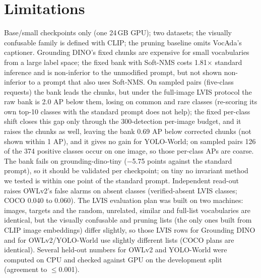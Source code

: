\documentclass[10pt,twocolumn,letterpaper]{article}
\begin{document}
\section{Limitations}
Base/small checkpoints only (one 24\,GB GPU); two datasets; the visually confusable family is defined with CLIP; the
pruning baseline omits VocAda's captioner. Grounding DINO's fixed chunks are expensive for small vocabularies from a large label space; the fixed bank with Soft-NMS costs 1.81$\times$ standard inference and is non-inferior to the unmodified prompt, but not shown non-inferior to a prompt that also uses Soft-NMS. On sampled pairs (five-class requests) the bank leads the chunks, but under the full-image LVIS protocol the raw bank is 2.0 AP
below them, losing on common and rare classes (re-scoring its own top-10 classes with the standard prompt does not help); the
fixed per-class shift closes this gap only through the 300-detection per-image budget, and it raises the chunks as well,
leaving the bank 0.69 AP below corrected chunks (not shown within 1 AP), and it gives no gain for YOLO-World; on sampled pairs 126 of the 374 positive classes occur on one image, so
those per-class APs are coarse.
The bank fails on grounding-dino-tiny ($-$5.75 points against the standard prompt), so it should be validated per
checkpoint; on tiny no invariant method we tested is within one point of the standard prompt. Independent read-out raises OWLv2's false alarms on absent classes (verified-absent LVIS classes; COCO 0.040 to 0.060).
The LVIS evaluation plan was built on two machines: images, targets and the random, unrelated, similar and full-list
vocabularies are identical, but the visually confusable and pruning lists (the only ones built from CLIP image
embeddings) differ slightly, so those LVIS rows for Grounding DINO and for OWLv2/YOLO-World use slightly different lists
(COCO plans are identical). Several held-out numbers for OWLv2 and YOLO-World were
computed on CPU and checked against GPU on the development split (agreement to $\le$0.001).
\end{document}

